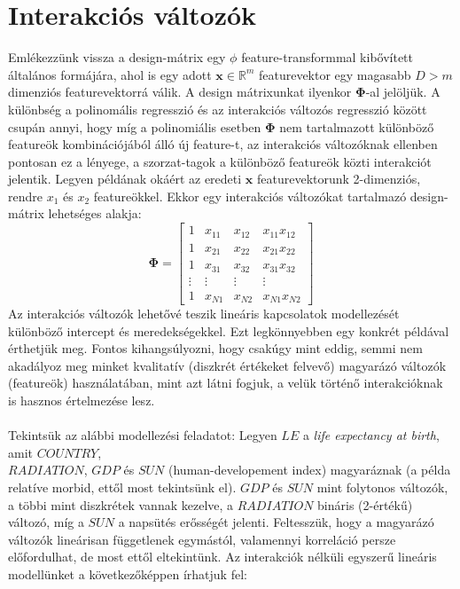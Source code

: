 \documentclass[14p]{report}
\def\pmb{\boldsymbol}
\newcounter{x}
\newcounter{y}
\newcounter{z}
\begin{document}
	\section{Interakciós változók}
	Emlékezzünk vissza a design-mátrix egy $\phi$ feature-transformmal kibővített általános formájára, ahol is egy adott $\pmb{x} \in \mathbb{R}^m$ featurevektor egy magasabb $D > m$ dimenziós featurevektorrá válik. A design mátrixunkat ilyenkor $\pmb{\Phi}$-al jelöljük. A különbség a polinomális regresszió és az interakciós változós regresszió között csupán annyi, hogy míg a polinomiális esetben $\pmb{\Phi}$ nem tartalmazott különböző featureök kombinációjából álló új feature-t, az interakciós változóknak ellenben pontosan ez a lényege, a szorzat-tagok a különböző featureök közti interakciót jelentik. Legyen példának okáért az eredeti $\pmb{x}$ featurevektorunk 2-dimenziós, rendre $x_1$ és $x_2$ featureökkel. Ekkor egy interakciós változókat tartalmazó design-mátrix lehetséges alakja:
	\[
		\pmb{\Phi} =
		\begin{bmatrix}
		1 & x_{11} & x_{12} & x_{11} x_{12} \\
		1 & x_{21} & x_{22} & x_{21} x_{22} \\
		1 & x_{31} & x_{32} & x_{31} x_{32} \\
		\vdots & \vdots & \vdots & \vdots \\ 
		1 & x_{N1} & x_{N2} & x_{N1} x_{N2}
		\end{bmatrix}		
	\]
	Az interakciós változók lehetővé teszik lineáris kapcsolatok modellezését különböző intercept és meredekségekkel. Ezt legkönnyebben egy konkrét példával érthetjük meg. Fontos kihangsúlyozni, hogy csakúgy mint eddig, semmi nem akadályoz meg minket kvalitatív (diszkrét értékeket felvevő) magyarázó változók (featureök) használatában, mint azt látni fogjuk, a velük történő interakcióknak is hasznos értelmezése lesz.
	\\
	\\
	Tekintsük az alábbi modellezési feladatot: Legyen $LE$ a \emph{life expectancy at birth}, amit $COUNTRY$,\\
	 $RADIATION$, $GDP$ és $SUN$ (human-developement index) magyaráznak (a példa relatíve morbid, ettől most tekintsünk el). $GDP$ és $SUN$ mint folytonos változók, a többi mint diszkrétek vannak kezelve, a $RADIATION$ bináris (2-értékű) változó, míg a $SUN$ a napsütés erősségét jelenti. Feltesszük, hogy a magyarázó változók lineárisan függetlenek egymástól, valamennyi korreláció persze előfordulhat, de most ettől eltekintünk. Az interakciók nélküli egyszerű lineáris modellünket a következőképpen írhatjuk fel:
\end{document}
